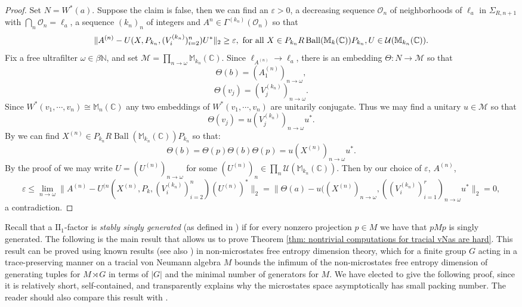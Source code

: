 \documentclass[10pt]{amsart}
\theoremstyle{definition}
\numberwithin{equation}{section}
\newcommand{\bC}{{\mathbb C}}
\newcommand{\bM}{{\mathbb M}}
\newcommand{\bN}{{\mathbb N}}
\newcommand{\cM}{{\mathcal M}}
\newcommand{\cU}{{\mathcal U}}
\DeclareMathOperator{\Ball}{Ball}
\begin{document}
\begin{proof}
Set $N=W^{*}(a)$.
Suppose the claim is false, then we can find an $\varepsilon>0$, a decreasing sequence $\mathcal{O}_{n}$ of neighborhoods of $\ell_{a}$ in $\Sigma_{R,n+1}$ with $\bigcap_{n}\mathcal{O}_{n}=\ell_{a}$, a sequence $(k_{n})_{n}$ of integers and $A^{n}\in \Gamma^{(k_{n})}(\mathcal{O}_{n})$ so that 
\[\|A^{(n)}-U(X,P_{k_{n}},(V_{i}^{(k_{n})})_{i=2}^{n})U^{*}\|_{2}\geq \varepsilon, \textnormal{ for all $X\in P_{k_{n}}R\Ball(\bM_{k}(\bC))P_{k_{n}}, U\in \cU(\bM_{k_{n}}(\bC))$.}\]
Fix a free ultrafilter $\omega\in\beta\bN$, and set $\cM=\prod_{n\to\omega}\bM_{k_{n}}(\bC)$. Since $\ell_{A^{(n)}}\to\ell_{a}$, there is an embedding $\Theta\colon N\to \cM$ so that 
\[\Theta(b)=(A_{1}^{(n)})_{n\to\omega},\]
\[\Theta(v_{j})=(V_{j}^{(k_{n})})_{n\to\omega}.\]
Since $W^{*}(v_{1},\cdots,v_{n})\cong \bM_{n}(\bC)$ any two embeddings of $W^{*}(v_{1},\cdots,v_{n})$ are unitarily conjugate. Thus we may find a unitary $u\in \cM$ so that 
\[\Theta(v_{j})=u(V_{j}^{(k_{n})})_{n\to\omega}u^{*}.\]
By \cite[Proposition II.5.1.5]{BlackadarOA}  we can find $X^{(n)}\in P_{k_{n}}R\Ball(\bM_{k_{n}}(\bC))P_{k_{n}}$ so that:
\[\Theta(b)=\Theta(p)\Theta(b)\Theta(p)=u(X^{(n)})_{n\to\omega}u^{*}.\]
By the proof of \cite[Theorem XIV.4.6]{TakesakiIII} we may write $U=(U^{(n)})_{n\to\omega}$ for some $(U^{(n)})_{n}\in \prod_{n}\cU(\bM_{k_{n}}(\bC))$. Then by our choice of $\varepsilon$, $A^{(n)}$,
\[\varepsilon\leq \lim_{n\to\omega}\|A^{(n)}-U^{(n}(X^{(n)},P_{k},(V_{i}^{(k_{n})})_{i=2}^{n})(U^{(n)})^{*}\|_{2}=\|\Theta(a)-u((X^{(n)})_{n\to\omega},((V^{(k_{n})}_{i})_{i=1}^{r})_{n\to\omega}u^{*}\|_{2}=0,\]
a contradiction. 




\end{proof}

 Recall that a $\textrm{II}_{1}$-factor is \emph{stably singly generated} (as defined in \cite{SorinSSG}) if for every nonzero projection $p\in M$ we have that $pMp$ is singly generated. 
The following is the main result that allows us to prove Theorem \ref{thm: nontrivial computations for tracial vNas are hard}.
This result can be proved using known results \cite[Corollary 5]{DimaNonMS} (see also \cite[Theorems A-C and Remark 6.9]{AldoNONMS}) in non-microstates free entropy dimension theory, which for a finite group $G$ acting in a trace-preserving manner on a tracial von Neumann algebra $M$ bounds the infimum of the non-microstates free entropy dimension of generating tuples for $M\rtimes G$ in terms of $|G|$ and the minimal number of generators for $M$. We have elected to give the following proof, since it is relatively short, self-contained, and transparently explains why the microstates space asymptotically has small packing number. The reader should also compare this result with \cite[Corollary 8.5 and 8.6]{DSSW}.
\end{document}
